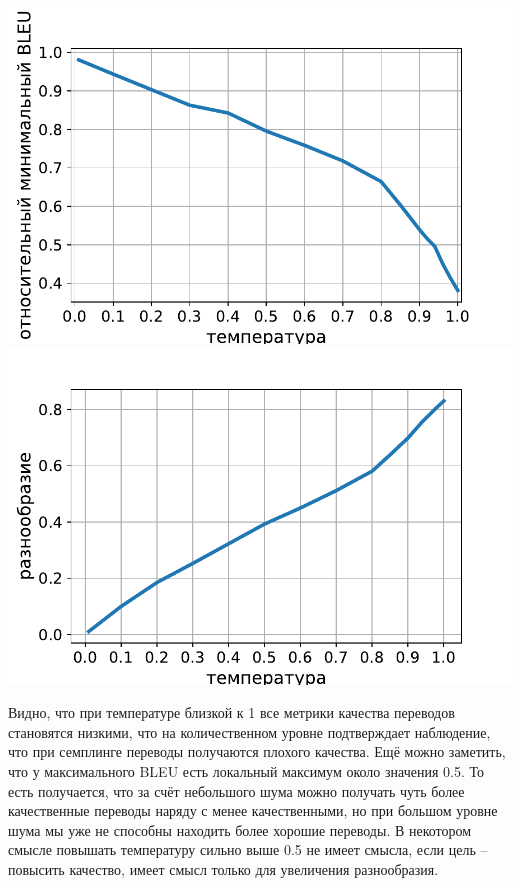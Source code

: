 \documentclass[a4paper, 12pt]{extarticle}
\begin{document}
\begin{center}
\includegraphics[scale=0.5]{min-bleu-temperature-sampling.pdf}
\includegraphics[scale=0.5]{diversity-temperature-sampling.pdf}
\end{center}

Видно, что при температуре близкой к 1 все метрики качества переводов становятся низкими, что на количественном уровне подтверждает наблюдение, что при семплинге переводы получаются плохого качества. Ещё можно заметить, что у максимального BLEU есть локальный максимум около значения 0.5. То есть получается, что за счёт небольшого шума можно получать чуть более качественные переводы наряду с менее качественными, но при большом уровне шума мы уже не способны находить более хорошие переводы. В некотором смысле повышать температуру сильно выше 0.5 не имеет смысла, если цель -- повысить качество, имеет смысл только для увеличения разнообразия.
\end{document}
